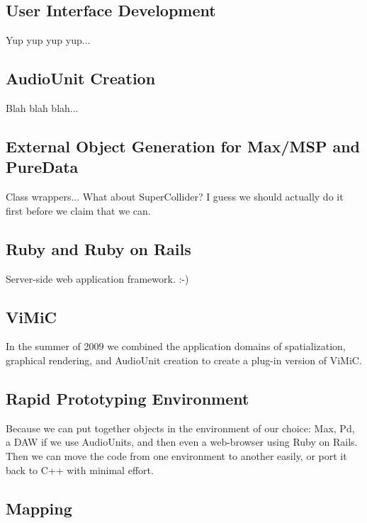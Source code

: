 \documentclass[twoside,10pt]{article}
\begin{document}
\subsection{User Interface Development}

Yup yup yup yup...

\subsection{AudioUnit Creation}

Blah blah blah...

\subsection{External Object Generation for Max/MSP and PureData}

Class wrappers...  What about SuperCollider?  I guess we should actually do it first before we claim that we can.

\subsection{Ruby and Ruby on Rails}

Server-side web application framework.  :-)

\subsection{ViMiC}
In the summer of 2009 we combined the application domains of spatialization, graphical rendering, and AudioUnit creation to create a plug-in version of ViMiC\cite{Peters:2008b}.


\subsection{Rapid Prototyping Environment}

Because we can put together objects in the environment of our choice: Max, Pd, a DAW if we use AudioUnits, and then even a web-browser using Ruby on Rails.  Then we can move the code from one environment to another easily, or port it back to C++ with minimal effort.

\subsection{Mapping}
\end{document}
